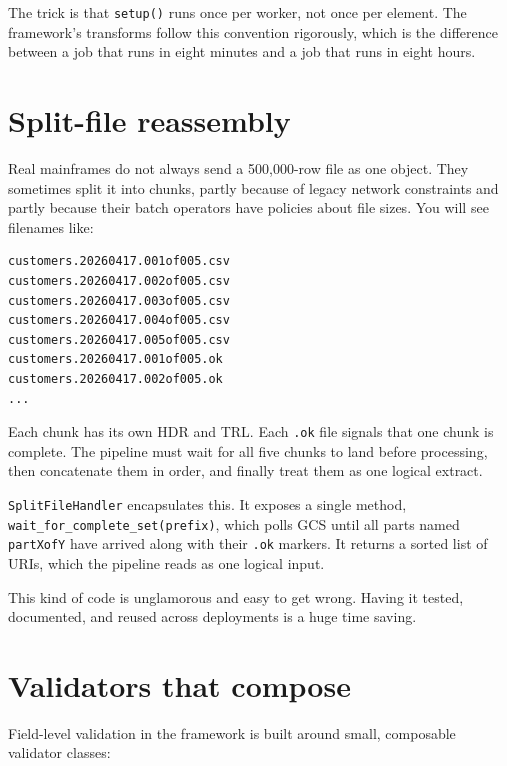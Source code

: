 \documentclass[
  11pt,
  british,
  oneside]{book}
\begin{document}
The trick is that \texttt{setup()} runs once per worker, not once per
element. The framework's transforms follow this convention rigorously,
which is the difference between a job that runs in eight minutes and a
job that runs in eight hours.

\hypertarget{split-file-reassembly}{%
\section{Split-file reassembly}\label{split-file-reassembly}}

Real mainframes do not always send a 500,000-row file as one object.
They sometimes split it into chunks, partly because of legacy network
constraints and partly because their batch operators have policies about
file sizes. You will see filenames like:

\begin{verbatim}
customers.20260417.001of005.csv
customers.20260417.002of005.csv
customers.20260417.003of005.csv
customers.20260417.004of005.csv
customers.20260417.005of005.csv
customers.20260417.001of005.ok
customers.20260417.002of005.ok
...
\end{verbatim}

Each chunk has its own HDR and TRL. Each \texttt{.ok} file signals that
one chunk is complete. The pipeline must wait for all five chunks to
land before processing, then concatenate them in order, and finally
treat them as one logical extract.

\texttt{SplitFileHandler} encapsulates this. It exposes a single method,
\texttt{wait\_for\_complete\_set(prefix)}, which polls GCS until all
parts named \texttt{partXofY} have arrived along with their \texttt{.ok}
markers. It returns a sorted list of URIs, which the pipeline reads as
one logical input.

This kind of code is unglamorous and easy to get wrong. Having it
tested, documented, and reused across deployments is a huge time saving.

\hypertarget{validators-that-compose}{%
\section{Validators that compose}\label{validators-that-compose}}

Field-level validation in the framework is built around small,
composable validator classes:
\end{document}
